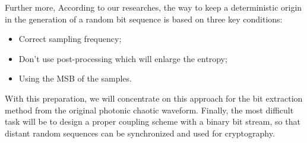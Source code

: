Further more, According to our researches, the way to keep a deterministic origin in the generation of a
random bit sequence is based on three key conditions:
\begin{itemize}
 \item Correct sampling frequency;
 \item Don't use post-processing which will enlarge the entropy;
 \item Using the MSB of the samples.
\end{itemize}
With this preparation, we will concentrate on this approach for the
bit extraction method from the original photonic chaotic waveform. Finally, the most
difficult task will be to design a proper coupling scheme with a binary bit stream, so that distant random sequences can be synchronized and used for cryptography.